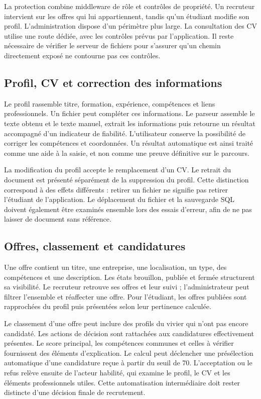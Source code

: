 La protection combine middleware de rôle et contrôles de propriété. Un recruteur intervient sur les offres qui lui appartiennent, tandis qu'un étudiant modifie son profil. L'administration dispose d'un périmètre plus large. La consultation des CV utilise une route dédiée, avec les contrôles prévus par l'application. Il reste nécessaire de vérifier le serveur de fichiers pour s'assurer qu'un chemin directement exposé ne contourne pas ces contrôles.

\subsection{Profil, CV et correction des informations}
Le profil rassemble titre, formation, expérience, compétences et liens professionnels. Un fichier peut compléter ces informations. Le parseur assemble le texte obtenu et le texte manuel, extrait les informations puis retourne un résultat accompagné d'un indicateur de fiabilité. L'utilisateur conserve la possibilité de corriger les compétences et coordonnées. Un résultat automatique est ainsi traité comme une aide à la saisie, et non comme une preuve définitive sur le parcours.

La modification du profil accepte le remplacement d'un CV. Le retrait du document est présenté séparément de la suppression du profil. Cette distinction correspond à des effets différents : retirer un fichier ne signifie pas retirer l'étudiant de l'application. Le déplacement du fichier et la sauvegarde SQL doivent également être examinés ensemble lors des essais d'erreur, afin de ne pas laisser de document sans référence.

\subsection{Offres, classement et candidatures}
Une offre contient un titre, une entreprise, une localisation, un type, des compétences et une description. Les états brouillon, publiée et fermée structurent sa visibilité. Le recruteur retrouve ses offres et leur suivi ; l'administrateur peut filtrer l'ensemble et réaffecter une offre. Pour l'étudiant, les offres publiées sont rapprochées du profil puis présentées selon leur pertinence calculée.

Le classement d'une offre peut inclure des profils du vivier qui n'ont pas encore candidaté. Les actions de décision sont rattachées aux candidatures effectivement présentes. Le score principal, les compétences communes et celles à vérifier fournissent des éléments d'explication. Le calcul peut déclencher une présélection automatique d'une candidature reçue à partir du seuil de 70. L'acceptation ou le refus relève ensuite de l'acteur habilité, qui examine le profil, le CV et les éléments professionnels utiles. Cette automatisation intermédiaire doit rester distincte d'une décision finale de recrutement.

